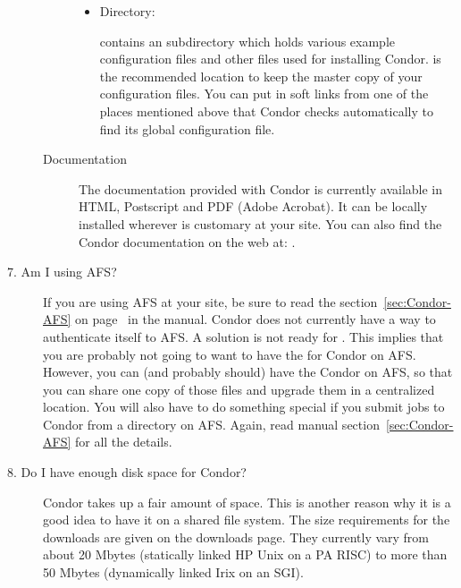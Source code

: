 \begin{description}
\begin{description}
\begin{itemize}
     \item {} Directory:

      contains an  subdirectory which holds various
     example configuration files and other files used for installing Condor.
      is the recommended location to keep the master copy of your
     configuration files.  You can put in soft links from one of the places
     mentioned above that Condor checks automatically to find its
     global configuration file. 
\end{itemize}

\item[Documentation]

The documentation provided with Condor is currently available in
     HTML, Postscript and PDF (Adobe Acrobat).  It can be locally installed
     wherever is customary at your site.  You can also find the Condor
     documentation on the web at:
     .

\end{description}

\item[7. Am I using AFS?]

If you are using AFS at your site, be sure to read the
section~\ref{sec:Condor-AFS} on page~\pageref{sec:Condor-AFS} in the
manual.
Condor does not currently have a way to authenticate itself to AFS.
A solution is not ready for
\VersionNotice.
This implies that you are probably not going to want
to have the  for Condor on AFS.
However, you can
(and probably should) have the Condor  on AFS, so
that you can share one copy of those files and upgrade them in a
centralized location.  You will also have to do something special if
you submit jobs to Condor from a directory on AFS.  Again, read manual
section~\ref{sec:Condor-AFS} for all the details.

\item[8. Do I have enough disk space for Condor?]

Condor takes up a fair amount of space.
This is another reason why it is a good idea to have it on a shared
file system.
The size requirements for the downloads are given on the
downloads page.
They currently vary from about 20 Mbytes (statically linked HP Unix
on a PA RISC)
to more than 50 Mbytes (dynamically linked Irix on an SGI).



\end{description}
